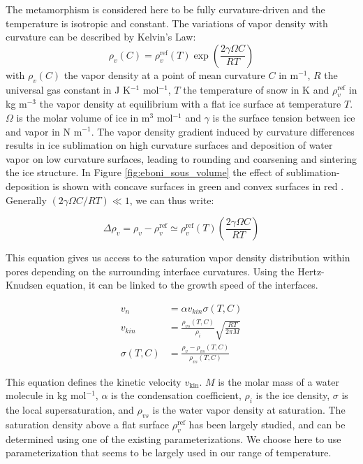 \documentclass[draft,ms]{agujournal2019}
\begin{document}
The metamorphism is considered here to be fully curvature-driven and the temperature is isotropic and constant. The variations of vapor density with curvature can be described by Kelvin's Law:
\begin{equation}\rho_v(C)=\rho_v^{\mathrm{ref}}(T) \exp \left(\frac{2 \gamma \Omega C}{R T}\right)\end{equation}
\noindent with $\rho_v(C)$ the vapor density at a point of mean curvature $C$ in m$^{-1}$, $R$ the universal gas constant in J K$^{-1}$ mol$^{-1}$, $T$ the temperature of snow in K and $\rho_v^{\mathrm{ref}}$ in kg m$^{-3}$ the vapor density at equilibrium with a flat ice surface at temperature $T$. $\Omega$ is the molar volume of ice in m$^3$ mol$^{-1}$ and $\gamma$ is the surface tension between ice and vapor in N m$^{-1}$. 
The vapor density gradient induced by curvature differences results in ice sublimation on high curvature surfaces and deposition of water vapor on low curvature surfaces, leading to rounding and coarsening and sintering the ice structure. In Figure \ref{fig:eboni_sous_volume} the effect of sublimation-deposition is shown with concave surfaces in green and convex surfaces in red \cite{ogawa2006representation}. Generally $(2 \gamma \Omega C / R T) \ll 1$, we can thus write:

\begin{equation}
\Delta \rho_v=\rho_v - \rho_v^{\mathrm{ref}} \simeq \rho_v^{\mathrm{ref}}(T)\left(\frac{2 \gamma \Omega C}{R T}\right)\label{eq:kelv_lin} 
\end{equation}

This equation gives us access to the saturation vapor density distribution within pores depending on the surrounding interface curvatures. Using the Hertz-Knudsen equation, it can be linked to the growth speed of the interfaces.

\begin{align}
v_{n} &= \alpha v_{k i n} \sigma(T, C) \\
v_{k i n} &= \frac{\rho_{v s}(T, C)}{\rho_i}\sqrt{\frac{R T}{2 \pi M}} \\
\sigma(T, C) &= \frac{\rho_v - \rho_{v s}(T, C)}{\rho_{v s}(T, C)}
\end{align}
\label{eq:hertz_knu}

This equation defines the kinetic velocity $v_{\mathrm{kin}}$. $M$ is the molar mass of a water molecule in kg mol$^{-1}$, $\alpha$ is the condensation coefficient, $\rho_i$ is the ice density, $\sigma$ is the local supersaturation, and $\rho_{v s}$ is the water vapor density at saturation. The saturation density above a flat surface $\rho_{v}^{\mathrm{ref}}$ has been largely studied, and can be determined using one of the existing parameterizations. We choose here to use  parameterization that seems to be largely used in our range of temperature. 
\end{document}
